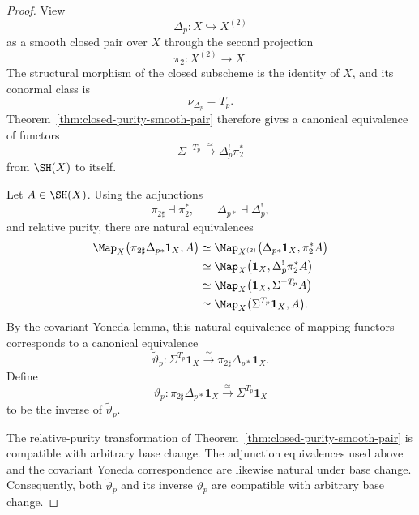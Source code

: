 \begin{proof}
View
\[
    \Delta_p:
    X\hookrightarrow X^{(2)}
\]
as a smooth closed pair over \(X\) through the second projection
\[
    \pi_2:X^{(2)}\longrightarrow X.
\]
The structural morphism of the closed subscheme is the identity of \(X\),
and its conormal class is
\[
    \nu_{\Delta_p}
    =
    T_p.
\]
Theorem~\ref{thm:closed-purity-smooth-pair} therefore gives a canonical
equivalence of functors
\[
    \Sigma^{-T_p}
    \xrightarrow{\simeq}
    \Delta_p^!\pi_2^*
\]
from \(\SH(X)\) to itself.

Let \(A\in\SH(X)\).  Using the adjunctions
\[
    \pi_{2\sharp}\dashv\pi_2^*,
    \qquad
    \Delta_{p*}\dashv\Delta_p^!,
\]
and relative purity, there are natural equivalences
\[
\begin{aligned}
    \Map_X
    \bigl(
      \pi_{2\sharp}\Delta_{p*}\mathbf1_X,
      A
    \bigr)
    &\simeq
    \Map_{X^{(2)}}
    \bigl(
      \Delta_{p*}\mathbf1_X,
      \pi_2^*A
    \bigr) \\
    &\simeq
    \Map_X
    \bigl(
      \mathbf1_X,
      \Delta_p^!\pi_2^*A
    \bigr) \\
    &\simeq
    \Map_X
    \bigl(
      \mathbf1_X,
      \Sigma^{-T_p}A
    \bigr) \\
    &\simeq
    \Map_X
    \bigl(
      \Sigma^{T_p}\mathbf1_X,
      A
    \bigr).
\end{aligned}
\]
By the covariant Yoneda lemma, this natural equivalence of mapping functors
corresponds to a canonical equivalence
\[
    \widetilde\vartheta_p:
    \Sigma^{T_p}\mathbf1_X
    \xrightarrow{\simeq}
    \pi_{2\sharp}\Delta_{p*}\mathbf1_X.
\]
Define
\[
    \vartheta_p:
    \pi_{2\sharp}\Delta_{p*}\mathbf1_X
    \xrightarrow{\simeq}
    \Sigma^{T_p}\mathbf1_X
\]
to be the inverse of \(\widetilde\vartheta_p\).

The relative-purity transformation of
Theorem~\ref{thm:closed-purity-smooth-pair}
is compatible with arbitrary base change.  The adjunction equivalences used
above and the covariant Yoneda correspondence are likewise natural under
base change.  Consequently, both
\(\widetilde\vartheta_p\) and its inverse \(\vartheta_p\) are compatible
with arbitrary base change.


\end{proof}
